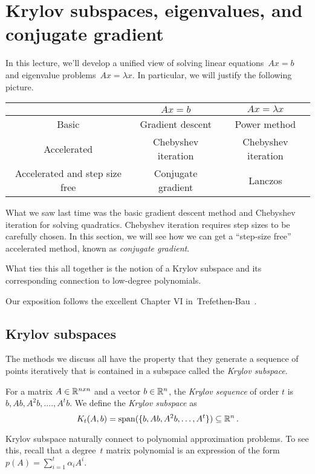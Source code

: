 \section{Krylov subspaces, eigenvalues, and conjugate gradient}

In this lecture, we'll develop a unified view of solving linear equations~$Ax=b$
and eigenvalue problems~$Ax=\lambda x.$ In particular, we will justify the
following picture.
%
\begin{center}
\begin{tabular}{ | c |c| c | } 
\hline
 & $Ax=b$ & $Ax=\lambda x$ \\ 
\hline
Basic & Gradient descent & Power method \\ 
\hline
Accelerated & Chebyshev iteration & Chebyshev iteration \\
\hline
Accelerated and step size free & Conjugate gradient & Lanczos \\
\hline
\end{tabular}
\end{center}

What we saw last time was the basic gradient descent method and Chebyshev
iteration for solving quadratics. Chebyshev iteration requires step sizes to be
carefully chosen. In this section, we will see how we can get a ``step-size
free'' accelerated method, known as \emph{conjugate gradient}.

What ties this all together is the notion of a Krylov subspace and its
corresponding connection to low-degree polynomials.

Our exposition follows the excellent Chapter VI
in~Trefethen-Bau~\cite{trefethen97}.

\subsection{Krylov subspaces}
%
The methods we discuss all have the property that they generate a sequence of
points iteratively that is contained in a subspace called the \emph{Krylov
subspace}.
%
\begin{definition}
For a matrix $A \in \mathbb{R}^{n x n}$ and a vector $b \in \mathbb{R}^n$, 
the \emph{Krylov sequence} of order $t$ is $b, Ab, A^2b, ...., A^tb$. 
We define the \emph{Krylov subspace} as
\[
K_t(A,b)=\mathrm{span}(\{b, Ab, A^2b, \ldots, A^t\}) \subseteq \mathbb{R}^n\,.
\]
\end{definition}

Krylov subspace naturally connect to polynomial approximation problems.
To see this, recall that a degree~$t$ matrix polynomial is an expression of the form
$p(A)=\sum_{i=1}^t \alpha_i A^i.$ 

